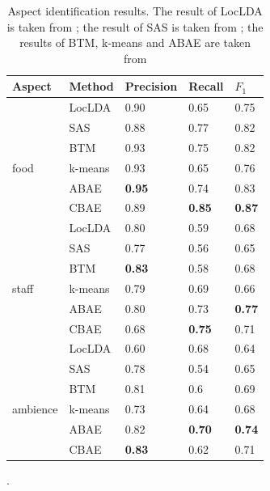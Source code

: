 \documentclass{article}
\begin{document}
\begin{table}[tbh!]
\begin{center}
\begin{tabular}[t]{l|l|l|l|l}
\hline
 Aspect & Method & Precision & Recall & $F_1$ \\
\hline
          & LocLDA      & 0.90          & 0.65          & 0.75           \\
          & SAS         & 0.88          & 0.77          & 0.82           \\
          & BTM         & 0.93          & 0.75          & 0.82           \\
food      & k-means     & 0.93          & 0.65          & 0.76           \\
          & ABAE        & \textbf{0.95} & 0.74          & 0.83           \\
          & CBAE        & 0.89          & \textbf{0.85} & \textbf{0.87}  \\
\hline
          & LocLDA      & 0.80          & 0.59          & 0.68           \\
          & SAS         & 0.77          & 0.56          & 0.65           \\
          & BTM         & \textbf{0.83} & 0.58          & 0.68           \\
staff     & k-means     & 0.79          & 0.69          & 0.66           \\
          & ABAE        & 0.80          & 0.73          & \textbf{0.77}  \\
          & CBAE        & 0.68          & \textbf{0.75} & 0.71           \\
\hline
          & LocLDA      & 0.60          & 0.68          & 0.64           \\
          & SAS         & 0.78          & 0.54          & 0.65           \\
          & BTM         & 0.81          & 0.6           & 0.69           \\
ambience  & k-means     & 0.73          & 0.64          & 0.68           \\
          & ABAE        & 0.82          & \textbf{0.70} & \textbf{0.74}  \\
          & CBAE        & \textbf{0.83} & 0.62          & 0.71           \\
\hline
\end{tabular}
\caption{Aspect identification results. The result of LocLDA is taken from \cite{Zhao2010JMA}; the result of SAS is taken from \cite{Wang2015}; the results of BTM, k-means and ABAE are taken from \cite{He2018ABAE}}.
\label{tab:eval}
\end{center}
\end{table}
\end{document}
